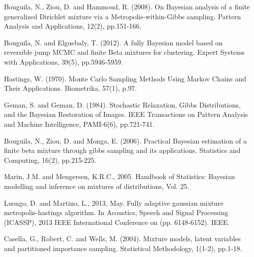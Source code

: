 \documentclass[conference]{IEEEtran}
\begin{document}
\begin{thebibliography}{[MT1]}
 Bouguila, N., Ziou, D. and Hammoud, R. (2008). On Bayesian analysis of a finite generalized Dirichlet mixture via a Metropolis-within-Gibbs sampling. Pattern Analysis and Applications, 12(2), pp.151-166.

 Bouguila, N. and Elguebaly, T. (2012). A fully Bayesian model based on reversible jump MCMC and finite Beta mixtures for clustering. Expert Systems with Applications, 39(5), pp.5946-5959.

 Hastings, W. (1970). Monte Carlo Sampling Methods Using Markov Chains and Their Applications. Biometrika, 57(1), p.97.

 Geman, S. and Geman, D. (1984). Stochastic Relaxation, Gibbs Distributions, and the Bayesian Restoration of Images. IEEE Transactions on Pattern Analysis and Machine Intelligence, PAMI-6(6), pp.721-741.

 Bouguila, N., Ziou, D. and Monga, E. (2006). Practical Bayesian estimation of a finite beta mixture through gibbs sampling and its applications. Statistics and Computing, 16(2), pp.215-225.



 Marin, J.M. and Mengersen, K.R.C., 2005. Handbook of Statistics: Bayesian modelling and inference on mixtures of distributions, Vol. 25.

 Luengo, D. and Martino, L., 2013, May. Fully adaptive gaussian mixture metropolis-hastings algorithm. In Acoustics, Speech and Signal Processing (ICASSP), 2013 IEEE International Conference on (pp. 6148-6152). IEEE.



 Casella, G., Robert, C. and Wells, M. (2004). Mixture models, latent variables and partitioned importance sampling. Statistical Methodology, 1(1-2), pp.1-18.
\end{thebibliography}
\end{document}
